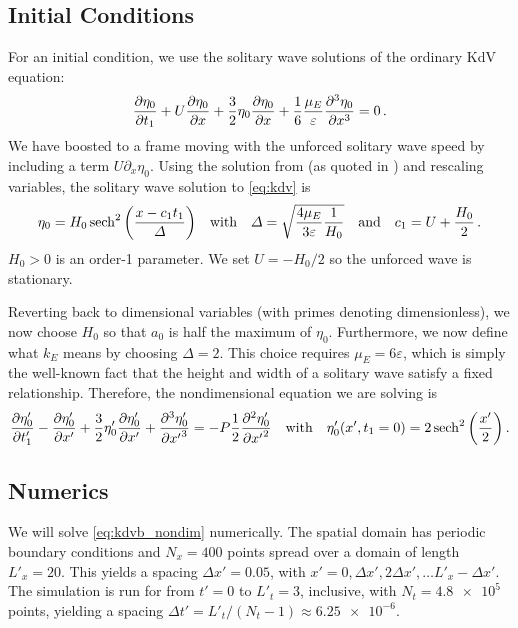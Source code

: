 \documentclass{jfm}
\renewcommand*{\epsilon}{\varepsilon}
\begin{document}
\subsection{Initial Conditions}
For an initial condition, we use the solitary wave solutions of
the ordinary KdV equation:
\begin{equation}
  \pdv{\eta_0}{t_1} + U\pdv{\eta_0}{x} + \frac{3}{2}
    \eta_0 \pdv{\eta_0}{x} + \frac{1}{6} \frac{\mu_E}{\epsilon}
    \pdv[3]{\eta_0}{x} = 0 \,.
  \label{eq:kdv}
\end{equation}
We have boosted to a frame moving with the unforced solitary wave speed
by including a term $U\partial_x \eta_0$.
Using the solution from \citet{dingemans1997water} (as quoted in
\citealp{brun2018convective}) and rescaling variables, the solitary
wave solution to \cref{eq:kdv} is
\begin{equation}
  \eta_0 = H_0 \sech^2\pqty{\frac{x - c_1 t_1}{\Delta}}
  \qq{with}
  \Delta = \sqrt{\frac{4 \mu_E}{3\epsilon} \frac{1}{H_0}}
  \qq{and}
  c_1 = U + \frac{H_0}{2} \,.
\end{equation}
$H_0>0$ is an order-1 parameter.
We set $U=-H_0/2$ so the unforced wave is stationary.

Reverting back to dimensional variables (with primes denoting
dimensionless), we now choose $H_0$ so that $a_0$ is half the maximum of
$\eta_0$.
Furthermore, we now define what $k_E$ means by choosing $\Delta = 2$.
This choice requires $\mu_E = 6 \epsilon$, which is simply the
well-known fact that the height and width of a solitary wave satisfy a
fixed relationship.
Therefore, the nondimensional equation we are solving is
\begin{equation}
  \pdv{\eta'_0}{t'_1} - \pdv{\eta'_0}{x'} + \frac{3}{2}
  \eta'_0 \pdv{\eta'_0}{x'} + \pdv[3]{\eta'_0}{{x'}} =
  -P \frac{1}{2} \pdv[2]{\eta'_0}{{x'}}
  \label{eq:kdvb_nondim}
  \qq{with}
  \eta'_0(x',t_1=0) = 2 \sech^2\pqty{\frac{x'}{2}} \,.
\end{equation}

\subsection{Numerics}
We will solve \cref{eq:kdvb_nondim} numerically.
The spatial domain has periodic boundary conditions and $N_x = 400$
points spread over a domain of length $L'_x = 20$.
This yields a spacing $\Delta x' = 0.05$, with $x' = 0, \Delta x',
2\Delta x', \ldots L'_x - \Delta x'$.
The simulation is run for from $t'= 0$ to $L'_t = 3$, inclusive, with
$N_t = \num{4.8e5}$ points, yielding a spacing $\Delta t' = L'_t/(N_t-1)
\approx \num{6.25e-6}$.
\end{document}
